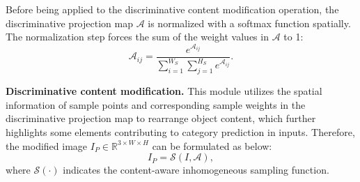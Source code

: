 \documentclass[letterpaper]{article} %
\begin{document}
Before being applied to the discriminative content modification operation, the discriminative projection map $ \mathcal{A} $ is normalized with a softmax function spatially. The normalization step forces the sum of the weight values in $ \mathcal{A} $ to 1:
\begin{equation}
 \mathcal{A}_{ij}= \frac{e^{\mathcal{A}_{ij}}}{\sum_{i=1}^{W_S}\sum_{j=1}^{H_S}e^{\mathcal{A}_{ij}}}.
\end{equation}

\textbf{Discriminative content modification.}
This module utilizes the spatial information of sample points and corresponding sample weights in the discriminative projection map to rearrange object content, which further highlights some elements contributing to category prediction in inputs. Therefore, the modified image $ I_P \in\mathbb{R}^{3\times W \times H} $ can be formulated as below:
\begin{equation}
I_P = \mathcal{S}(I, \mathcal{A}),
\end{equation}
where $ \mathcal{S}(\cdot) $ indicates the content-aware inhomogeneous sampling function.
\end{document}
